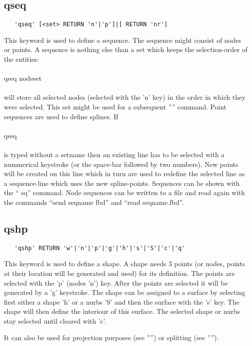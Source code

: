 \documentclass{article}
\begin{document}
\subsection{\label{qseq}qseq}
\begin{verbatim}
   'qseq' [<set> RETURN 'n'|'p']|[ RETURN 'nr'] 
\end{verbatim}
This keyword is used to define a sequence. The sequence might consist of nodes or points. A sequence is nothing else than a set which keeps the selection-order of the entities:\\\\qseq nodeset\\\\will store all selected nodes (selected with the 'n' key) in the order in which they were selected. This set might be used for a subsequent '''' command. Point sequences are used to define splines. If\\\\qseq\\\\is typed without a setname then an existing line has to be selected with a nummerical keystroke (or the space-bar followed by two numbers). New points will be created on this line which in turn are used to redefine the selected line as a sequence-line which uses the new spline-points. Sequences can be shown with the `` sq'' command. Node sequences can be written to a file and read again with the commands ``send seqname fbd'' and ``read seqname.fbd''.

\subsection{\label{qshp}qshp}
\begin{verbatim}
   'qshp' RETURN 'w'|'n'|'p'|'g'|'h'|'s'|'S'|'c'|'q'
\end{verbatim}
This keyword is used to define a shape. A shape needs 3 points (or nodes, points at their location will be generated and used) for its definition. The points are selected with the 'p' (nodes 'n') key. After the points are selected it will be generated by a 'g' keystroke. The shape can be assigned to a surface by selecting first either a shape 'h' or a nurbs 'S' and then the surface with the 's' key. The shape will then define the interiour of this surface. The selected shape or nurbs stay selected until cleared with 'c'.

It can also be used for projection purposes (see '''') or splitting (see '''').
\end{document}
